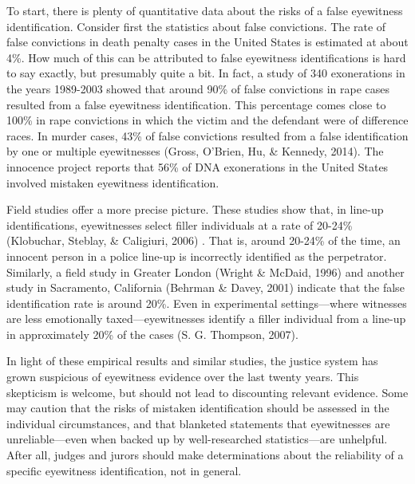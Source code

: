 \documentclass[
  letterpaper,
  DIV=11,
  numbers=noendperiod]{scrartcl}
\begin{document}
To start, there is plenty of quantitative data about the risks of a
false eyewitness identification. Consider first the statistics about
false convictions. The rate of false convictions in death penalty cases
in the United States is estimated at about 4\%. How much of this can be
attributed to false eyewitness identifications is hard to say exactly,
but presumably quite a bit. In fact, a study of 340 exonerations in the
years 1989-2003 showed that around 90\% of false convictions in rape
cases resulted from a false eyewitness identification. This percentage
comes close to 100\% in rape convictions in which the victim and the
defendant were of difference races. In murder cases, 43\% of false
convictions resulted from a false identification by one or multiple
eyewitnesses (Gross, O'Brien, Hu, \& Kennedy, 2014). The innocence
project reports that 56\% of DNA exonerations in the United States
involved mistaken eyewitness identification.

Field studies offer a more precise picture. These studies show that, in
line-up identifications, eyewitnesses select filler individuals at a
rate of 20-24\% (Klobuchar, Steblay, \& Caligiuri, 2006) . That is,
around 20-24\% of the time, an innocent person in a police line-up is
incorrectly identified as the perpetrator. Similarly, a field study in
Greater London (Wright \& McDaid, 1996) and another study in Sacramento,
California (Behrman \& Davey, 2001) indicate that the false
identification rate is around 20\%. Even in experimental
settings---where witnesses are less emotionally taxed---eyewitnesses
identify a filler individual from a line-up in approximately 20\% of the
cases (S. G. Thompson, 2007).

In light of these empirical results and similar studies, the justice
system has grown suspicious of eyewitness evidence over the last twenty
years. This skepticism is welcome, but should not lead to discounting
relevant evidence. Some may caution that the risks of mistaken
identification should be assessed in the individual circumstances, and
that blanketed statements that eyewitnesses are unreliable---even when
backed up by well-researched statistics---are unhelpful. After all,
judges and jurors should make determinations about the reliability of a
specific eyewitness identification, not in general.
\end{document}

